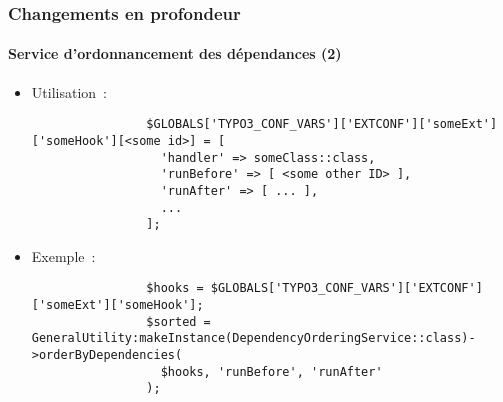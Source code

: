 \begin{frame}[fragile]
	\frametitle{Changements en profondeur}
	\framesubtitle{Service d'ordonnancement des dépendances (2)}

	\lstset{basicstyle=\tiny\ttfamily}

	\begin{itemize}

		\item Utilisation~:

			\begin{lstlisting}
				$GLOBALS['TYPO3_CONF_VARS']['EXTCONF']['someExt']['someHook'][<some id>] = [
				  'handler' => someClass::class,
				  'runBefore' => [ <some other ID> ],
				  'runAfter' => [ ... ],
				  ...
				];
			\end{lstlisting}

		\item Exemple~:

			\begin{lstlisting}
				$hooks = $GLOBALS['TYPO3_CONF_VARS']['EXTCONF']['someExt']['someHook'];
				$sorted = GeneralUtility:makeInstance(DependencyOrderingService::class)->orderByDependencies(
				  $hooks, 'runBefore', 'runAfter'
				);
			\end{lstlisting}

	\end{itemize}

\end{frame}


